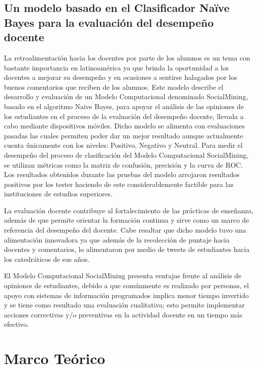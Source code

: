 \documentclass[sigconf]{acmart}
\begin{document}
\subsection{Un modelo basado en el Clasificador Naïve Bayes para la evaluación del desempeño docente}
La retroalimentación hacia los docentes por parte de los alumnos es un tema con bastante importancia en latinoamérica ya que brinda la oportunidad a los docentes a mejorar su desempeño y en ocasiones a sentirse halagados por los buenos comentarios que reciben de los alumnos. Este modelo describe el desarrollo y evaluación de un Modelo Computacional denominado SocialMining, basado en el algoritmo Naive Bayes, para apoyar el análisis de las opiniones de los estudiantes en el proceso de la evaluación del desempeño docente, llevada a cabo mediante dispositivos móviles. Dicho modelo se alimenta con evaluaciones pasadas las cuales permiten poder dar un mejor resultado aunque actualmente cuenta únicamente con los niveles: Positivo, Negativo y Neutral. Para medir el desempeño del proceso de clasificación del Modelo Computacional SocialMining, se utilizan métricas como la matriz de confusión, precisión y la curva de ROC. Los resultados obtenidos durante las pruebas del modelo arrojaron resultados positivos por los tester haciendo de este considerablemente factible para las instituciones de estudios superiores. 

La evaluación docente contribuye al fortalecimiento de las prácticas de enseñanza, además de que permite orientar la formación continua y sirve como un marco de referencia del desempeño del docente. Cabe resaltar que dicho modelo tuvo una alimentación innovadora ya que además de la recolección de puntaje hacia docentes y comentarios, lo alimentaron por medio de tweets de estudiantes hacia los catedráticos de sus años.

El Modelo Computacional SocialMining presenta ventajas frente al análisis de opiniones de estudiantes, debido a que comúnmente es realizado por personas, el apoyo con sistemas de información programados implica menor tiempo invertido y se tiene como resultado una evaluación cualitativa; esto permite implementar acciones correctivas y/o preventivas en la actividad docente en un tiempo más efectivo.\citep{Rincon}\citep{Lou}\citep{Gupte}


\section{Marco Teórico}
\end{document}
